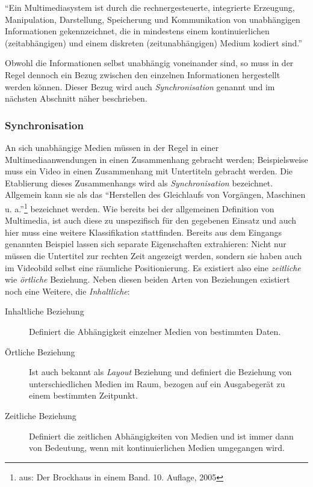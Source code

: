   \begin{definition}[Multimediasystem]\label{def:multimediasystem}
    "`Ein Multimediasystem ist durch die rechnergesteuerte, integrierte Erzeugung, Manipulation, Darstellung, Speicherung und Kommunikation von unabhängigen Informationen gekennzeichnet, die in mindestens einem kontinuierlichen (zeitabhängigen) und einem diskreten (zeitunabhängigen) Medium kodiert sind."' \emph{\citep[S. 13]{multimedia_technologie}}
  \end{definition}
  

  Obwohl die Informationen selbst unabhängig voneinander sind, so muss in der Regel dennoch ein Bezug zwischen den einzelnen Informationen hergestellt werden können. Dieser Bezug wird auch \emph{Synchronisation} genannt und im nächsten Abschnitt näher beschrieben.

\subsubsection{Synchronisation} %
\label{ssub:synchronisation}

  An sich unabhängige Medien müssen in der Regel in einer Multimediaanwendungen in einen Zusammenhang gebracht werden; Beispielsweise muss ein Video in einen Zusammenhang mit Untertiteln gebracht werden. Die Etablierung dieses Zusammenhangs wird als \emph{Synchronisation} bezeichnet. Allgemein kann sie als das "`Herstellen des Gleichlaufs von Vorgängen, Maschinen u. a."'\footnote{aus: Der Brockhaus in einem Band. 10. Auflage, 2005} bezeichnet werden. Wie bereits bei der allgemeinen Definition von Multimedia, ist auch diese zu unspezifisch für den gegebenen Einsatz und auch hier muss eine weitere Klassifikation stattfinden. Bereits aus dem Eingangs genannten Beispiel lassen sich separate Eigenschaften extrahieren: Nicht nur müssen die Untertitel zur rechten Zeit angezeigt werden, sondern sie haben auch im Videobild selbst eine räumliche Positionierung. Es existiert also eine \emph{zeitliche} wie \emph{örtliche} Beziehung. Neben diesen beiden Arten von Beziehungen existiert noch eine Weitere, die \emph{Inhaltliche}:
  
  \begin{description}
    \item[Inhaltliche Beziehung] Definiert die Abhängigkeit einzelner Medien von bestimmten Daten.
    \item[Örtliche Beziehung] Ist auch bekannt als \emph{Layout} Beziehung und definiert die Beziehung von unterschiedlichen Medien im Raum, bezogen auf ein Ausgabegerät zu einem bestimmten Zeitpunkt.
    \item[Zeitliche Beziehung] Definiert die zeitlichen Abhängigkeiten von Medien und ist immer dann von Bedeutung, wenn mit kontinuierlichen Medien umgegangen wird.
  \end{description}
  
